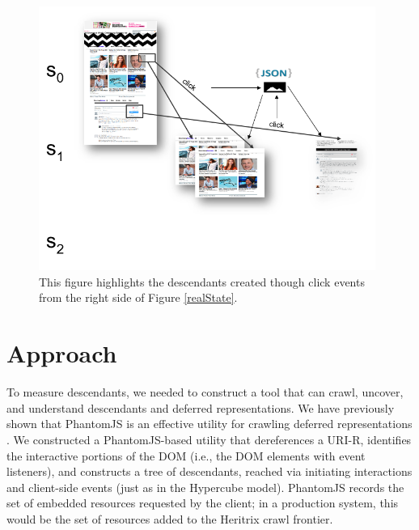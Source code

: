 \documentclass{sig-alternate}
\begin{document}
\begin{figure}[hp]
\centering
\includegraphics[width=0.98\textwidth]{./imgs/realStates_right.png}
\caption{This figure highlights the descendants created though click events from the right side of Figure \ref{realState}.}
\label{realStateR}
\end{figure}




\section{Approach}
\label{approach}

To measure descendants, we needed to construct a tool that can crawl, uncover, and understand descendants and deferred representations. We have previously shown that PhantomJS is an effective utility for crawling deferred representations \cite{crawlingDeferred}. 
We constructed a PhantomJS-based utility that dereferences a URI-R, identifies the interactive portions of the DOM (i.e., the DOM elements with event listeners), and constructs a tree of descendants, reached via initiating interactions and client-side events (just as in the Hypercube model). PhantomJS records the set of embedded resources requested by the client; in a production system, this would be the set of resources added to the Heritrix crawl frontier.
\end{document}
